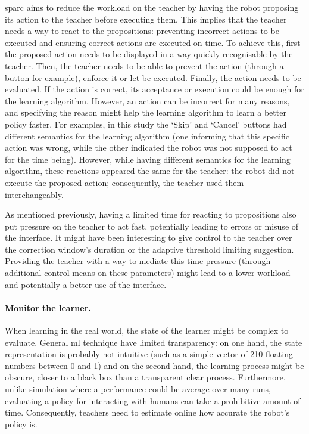 \gls{sparc} aims to reduce the workload on the teacher by having the robot proposing its action to the teacher before executing them. This implies that the teacher needs a way to react to the propositions: preventing incorrect actions to be executed and ensuring correct actions are executed on time. To achieve this, first the proposed action needs to be displayed in a way quickly recognisable by the teacher. Then, the teacher needs to be able to prevent the action (through a button for example), enforce it or let be executed. Finally, the action needs to be evaluated. If the action is correct, its acceptance or execution could be enough for the learning algorithm. However, an action can be incorrect for many reasons, and specifying the reason might help the learning algorithm to learn a better policy faster. For examples, in this study the `Skip' and `Cancel' buttons had different semantics for the learning algorithm (one informing that this specific action was wrong, while the other indicated the robot was not supposed to act for the time being). However, while having different semantics for the learning algorithm, these reactions appeared the same for the teacher: the robot did not execute the proposed action; consequently, the teacher used them interchangeably.

As mentioned previously, having a limited time for reacting to propositions also put pressure on the teacher to act fast, potentially leading to errors or misuse of the interface. It might have been interesting to give control to the teacher over the correction window's duration or the adaptive threshold limiting suggestion. Providing the teacher with a way to mediate this time pressure (through additional control means on these parameters) might lead to a lower workload and potentially a better use of the interface. 

\paragraph{Monitor the learner.}

When learning in the real world, the state of the learner might be complex to evaluate. General \gls{ml} technique have limited transparency: on one hand, the state representation is probably not intuitive (such as a simple vector of 210 floating numbers between 0 and 1) and on the second hand, the learning process might be obscure, closer to a black box than a transparent clear process. Furthermore, unlike simulation where a performance could be average over many runs, evaluating a policy for interacting with humans can take a prohibitive amount of time. Consequently, teachers need to estimate online how accurate the robot's policy is. 

